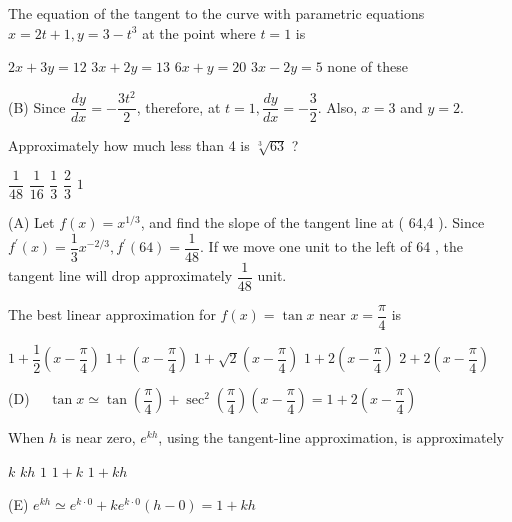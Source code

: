 \newpage




\question
The equation of the tangent to the curve with parametric equations $x=2 t+1, y=3-t^{3}$ at the point where $t=1$ is
\begin{choices}
  \choice $2 x+3 y=12$
  \CorrectChoice $3 x+2 y=13$
  \choice $6 x+y=20$
  \choice $3 x-2 y=5$
  \choice none of these
\end{choices}
\begin{solution}
(B) Since $\dfrac{d y}{d x}=-\dfrac{3 t^{2}}{2}$, therefore, at $t=1, \dfrac{d y}{d x}=-\dfrac{3}{2}$. Also, $x=3$ and $y=2$.
\end{solution}

\question
Approximately how much less than 4 is $\sqrt[3]{63}$ ?
\begin{choices}
  \CorrectChoice $\dfrac{1}{48}$
  \choice $\dfrac{1}{16}$
  \choice $\dfrac{1}{3}$
  \choice $\dfrac{2}{3}$
  \choice $1$
\end{choices}
\begin{solution}
(A) Let $f(x)=x^{1 / 3}$, and find the slope of the tangent line at ( 64,4 ). Since $f^{\prime}(x)= \dfrac{1}{3} x^{-2 / 3}, f^{\prime}(64)=\dfrac{1}{48}$. If we move one unit to the left of 64 , the tangent line will drop approximately $\dfrac{1}{48}$ unit.
\end{solution}

\question
The best linear approximation for $f(x)=\tan x$ near $x=\dfrac{\pi}{4}$ is
\begin{choices}
  \choice $1+\dfrac{1}{2}\left(x-\dfrac{\pi}{4}\right)$
  \choice $1+\left(x-\dfrac{\pi}{4}\right)$
  \choice $1+\sqrt{2}\left(x-\dfrac{\pi}{4}\right)$
  \CorrectChoice $1+2\left(x-\dfrac{\pi}{4}\right)$
  \choice $2+2\left(x-\dfrac{\pi}{4}\right)$
\end{choices}
\begin{solution}
(D) $\quad \tan x \simeq \tan \left(\dfrac{\pi}{4}\right)+\sec ^{2}\left(\dfrac{\pi}{4}\right)\left(x-\dfrac{\pi}{4}\right)=1+2\left(x-\dfrac{\pi}{4}\right)$
\end{solution}





\newpage




\question
When $h$ is near zero, $e^{k h}$, using the tangent-line approximation, is approximately
\begin{choices}
  \choice $k$
  \choice $k h$
  \choice $1$
  \choice $1+k$
  \CorrectChoice $1+k h$
\end{choices}
\begin{solution}
(E) $e^{k h} \simeq e^{k \cdot 0}+k e^{k \cdot 0}(h-0)=1+k h$
\end{solution}

